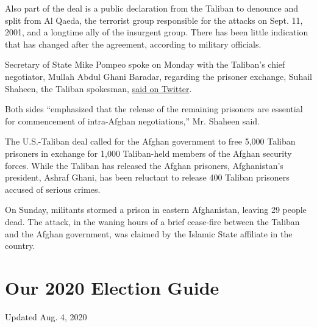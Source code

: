 Also part of the deal is a public declaration from the Taliban to
denounce and split from Al Qaeda, the terrorist group responsible for
the attacks on Sept. 11, 2001, and a longtime ally of the insurgent
group. There has been little indication that has changed after the
agreement, according to military officials.

Secretary of State Mike Pompeo spoke on Monday with the Taliban's chief
negotiator, Mullah Abdul Ghani Baradar, regarding the prisoner exchange,
Suhail Shaheen, the Taliban spokesman,
\href{https://twitter.com/suhailshaheen1/status/1290350620210163712}{said
on Twitter}.

Both sides ``emphasized that the release of the remaining prisoners are
essential for commencement of intra-Afghan negotiations,'' Mr. Shaheen
said.

The U.S.-Taliban deal called for the Afghan government to free 5,000
Taliban prisoners in exchange for 1,000 Taliban-held members of the
Afghan security forces. While the Taliban has released the Afghan
prisoners, Afghanistan's president, Ashraf Ghani, has been reluctant to
release 400 Taliban prisoners accused of serious crimes.

On Sunday, militants stormed a prison in eastern Afghanistan, leaving 29
people dead. The attack, in the waning hours of a brief cease-fire
between the Taliban and the Afghan government, was claimed by the
Islamic State affiliate in the country.

\hypertarget{our-2020-election-guide}{%
\section{Our 2020 Election Guide}\label{our-2020-election-guide}}

Updated Aug. 4, 2020


